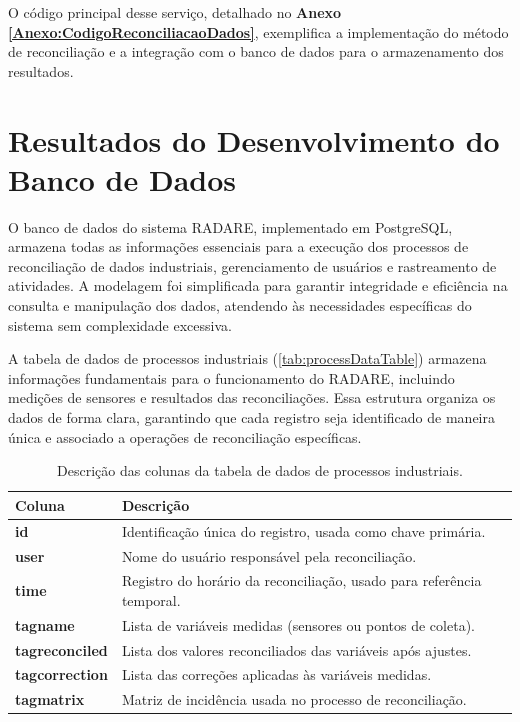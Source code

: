 O código principal desse serviço, detalhado no \textbf{Anexo \ref{Anexo:CodigoReconciliacaoDados}}, exemplifica a implementação do método de reconciliação e a integração com o banco de dados para o armazenamento dos resultados.

\section{Resultados do Desenvolvimento do Banco de Dados}

O banco de dados do sistema RADARE, implementado em PostgreSQL, armazena todas as informações essenciais para a execução dos processos de reconciliação de dados industriais, gerenciamento de usuários e rastreamento de atividades. A modelagem foi simplificada para garantir integridade e eficiência na consulta e manipulação dos dados, atendendo às necessidades específicas do sistema sem complexidade excessiva.

A tabela de dados de processos industriais (\autoref{tab:processDataTable}) armazena informações fundamentais para o funcionamento do RADARE, incluindo medições de sensores e resultados das reconciliações. Essa estrutura organiza os dados de forma clara, garantindo que cada registro seja identificado de maneira única e associado a operações de reconciliação específicas.

\begin{table}[htbp!]
    \centering
    \label{tab:processDataTable}
    \begin{tabular}{|l|p{10cm}|}
        \hline
        \textbf{Coluna} & \textbf{Descrição} \\ \hline
        \textbf{id} & Identificação única do registro, usada como chave primária. \\ \hline
        \textbf{user} & Nome do usuário responsável pela reconciliação. \\ \hline
        \textbf{time} & Registro do horário da reconciliação, usado para referência temporal. \\ \hline
        \textbf{tagname} & Lista de variáveis medidas (sensores ou pontos de coleta). \\ \hline
        \textbf{tagreconciled} & Lista dos valores reconciliados das variáveis após ajustes. \\ \hline
        \textbf{tagcorrection} & Lista das correções aplicadas às variáveis medidas. \\ \hline
        \textbf{tagmatrix} & Matriz de incidência usada no processo de reconciliação. \\ \hline
    \end{tabular}
    \caption{Descrição das colunas da tabela de dados de processos industriais.}
\end{table}
